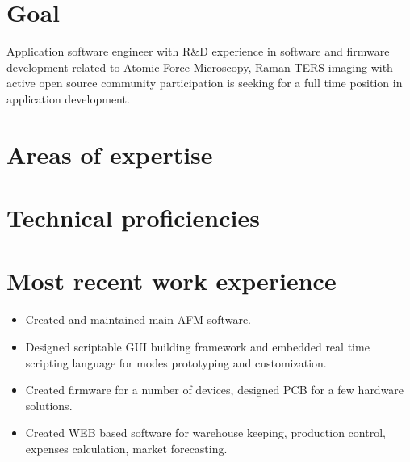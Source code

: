 \documentclass{sb_cv}
\begin{document}
\makecvtitle

\section{Goal}
Application software engineer with R\&D experience in software and firmware development related to Atomic Force Microscopy, Raman TERS imaging with active open source community participation is seeking for a full time position in application development.

\section{Areas of expertise}



\section{Technical proficiencies}




\section{Most recent work experience}
\begin{itemize}
\item Created and maintained main AFM software.
\item Designed scriptable GUI building framework and embedded real time scripting language for modes prototyping and customization.
\item Created firmware for a number of devices, designed PCB for a few hardware solutions.
\item Created WEB based software for warehouse keeping, production control, expenses calculation, market forecasting.
\end{itemize}
\end{document}

